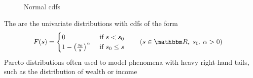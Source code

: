 \begin{frame}

    \begin{figure}
   \begin{center}
    \caption{\label{f:normal_cdfs} Normal {\sc cdf}s }
   \end{center}
    \end{figure}
    
\end{frame}


\begin{frame}

    \vspace{2em}
    \Eg
    The  are the univariate distributions
    with {\sc cdf}s of the form
    \begin{equation*}
        F(s) = 
        \begin{cases}
            0   
                & \text{ if } s < s_0
            \\
            1 - \left(
                    \frac{s_0}{s}
                \right)^{\alpha} 
                & \text{ if } s_0 \leq s
        \end{cases}
        \qquad (s \in \RR, \; s_0, \, \alpha > 0)
    \end{equation*}
    Pareto distributions often used to model phenomena with heavy right-hand tails, 
    such as the distribution of wealth or income

\end{frame}

